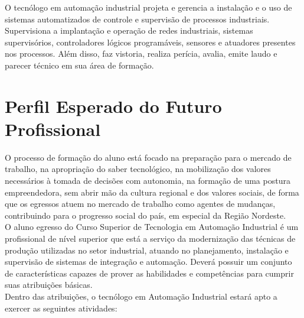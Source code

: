 O tecnólogo em automação industrial projeta e gerencia a instalação e o uso de sistemas automatizados de controle e supervisão de processos industriais. Supervisiona a implantação e operação de redes industriais, sistemas supervisórios, controladores lógicos programáveis, sensores e atuadores presentes nos processos. Além disso, faz vistoria, realiza perícia, avalia, emite laudo e parecer técnico em sua área de formação.

\chapter{Perfil Esperado do Futuro Profissional}

O processo de formação do aluno está focado na preparação para o mercado de trabalho, na apropriação do saber tecnológico, na mobilização dos valores necessários à tomada de decisões com autonomia, na formação de uma postura empreendedora, sem abrir mão da cultura regional e dos valores sociais, de forma que os egressos atuem no mercado de trabalho como agentes de mudanças, contribuindo para o progresso social do país, em especial da Região Nordeste.\\

O aluno egresso do Curso Superior de Tecnologia em Automação Industrial é um profissional de nível superior que está a serviço da modernização das técnicas de produção utilizadas no setor industrial, atuando no planejamento, instalação e supervisão de sistemas de integração e automação. Deverá possuir um conjunto de características capazes de prover as habilidades e competências para cumprir suas atribuições básicas.\\

Dentro das atribuições, o tecnólogo em Automação Industrial estará apto a exercer as seguintes atividades:

